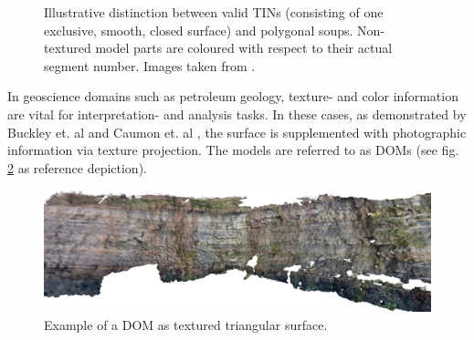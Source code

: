 \documentclass[review]{elsarticle}
\begin{document}
\begin{figure}[htbp]
\begin{center}
	 	\begin{minipage}{\columnwidth}
	 		\centering
	 	\end{minipage}
	\caption{Illustrative distinction between valid \glspl{TIN} (consisting of one exclusive, smooth, closed surface) and polygonal soups. Non-textured model parts are coloured with respect to their actual segment number. Images taken from \cite{Kehl2017_PhDThesis}.}
	\label{fig:representations:meshDistinction}
\end{center}
\end{figure}

In geoscience domains such as petroleum geology, texture- and color information are vital for interpretation- and analysis tasks. In these cases, as demonstrated by Buckley et. al \cite{Buckley2008a} and Caumon et. al \cite{Caumon2013}, the surface is supplemented with photographic information via texture projection. The models are referred to as \glspl{DOM} (see fig. \ref{fig:representations:DOM} as reference depiction).%


\begin{figure}[htbp]
\begin{center}
	\includegraphics[width=0.95\linewidth]{graphics/DOM00}
	\caption{Example of a \gls{DOM} as textured triangular surface.}
	\label{fig:representations:DOM}
\end{center}
\end{figure}
\end{document}
